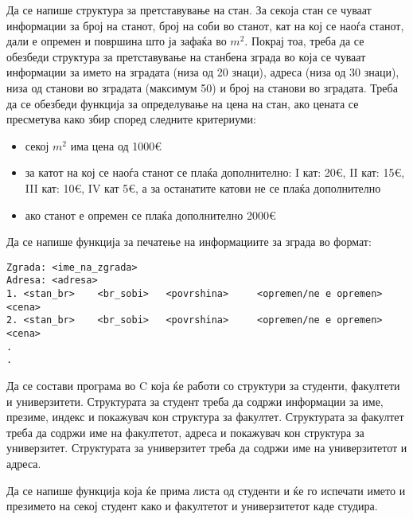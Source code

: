 \documentclass[12pt,a4paper]{exam}
\begin{document}
\begin{questions}
\question
Да се напише структура за претставување на стан. За секоја стан се чуваат
информации за број на станот, број на соби во станот, кат на кој се наоѓа
станот, дали е опремен и површина што ја зафаќа во $m^2$. Покрај тоа, треба да
се обезбеди структура за претставување на станбена зграда во која се чуваат
информации за името на зградата (низа од 20 знаци), адреса (низа од 30 знаци),
низа од станови во зградата (максимум 50) и број на станови во зградата. Треба
да се обезбеди функција за определување на цена на стан, ако цената се
пресметува како збир според следните критериуми: 
\begin{itemize}
  \item секој $m^2$ има цена од 1000\euro
  \item за катот на кој се наоѓа станот се плаќа дополнително: I кат: 20\euro,
  II кат: 15\euro, III кат: 10\euro, IV кат 5\euro, а за останатите катови не се
  плаќа дополнително
  \item ако станот е опремен се плаќа дополнително 2000\euro
\end{itemize}
Да се напише функција за печатење на информациите за зграда во формат:
\begin{verbatim}
Zgrada: <ime_na_zgrada>
Adresa: <adresa>
1. <stan_br>    <br_sobi>   <povrshina>     <opremen/ne e opremen>      <cena>
2. <stan_br>    <br_sobi>   <povrshina>     <opremen/ne e opremen>      <cena>
.
.
\end{verbatim}

\question
Да се состави програма во C која ќе работи со структури за студенти, факултети и
универзитети. Структурата за студент треба да содржи информации за име, презиме, индекс и
покажувач кон структура за факултет. Структурата за факултет треба да содржи име на
факултетот, адреса и покажувач кон структура за универзитет. Структурата за универзитет треба
да содржи име на универзитетот и адреса.

Да се напише функција која ќе прима листа од студенти и ќе го испечати името и презимето на
секој студент како и факултетот и универзитетот каде студира.

\end{questions}
\end{document}
